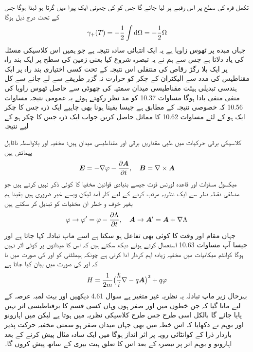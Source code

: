 تکمل قرہ کی سطح پر اس رقبے پر لیا جائے گا جس کو  کی چھوٹی ایک پیرا میں گرتا ہو لہذا  ہوگا جس کے تحت درج ذیل ہوگا 
\begin{align} 
\gamma_{+} (T) = - \frac{1}{2} \int \dif \Omega = - \frac{1}{2} \Omega
\end{align}
جہاں مبده پر ٹھوس زاویا  ہے یہ ایک انتہائی سادہ نتیجہ ہے جو ہمیں اس کلاسیکی مسئلہ کی یاد دلاتا ہے جس سے ہم نے یہ تبصرہ شروع کیا یعنی زمین کی سطح پر ایک بند راہ پر ایک بلا رگڑ   رقاص   کی منتقلی اس نتیجہ کے تحت کسی اختیاری بند راہ پر ایک مقناطیس کی مدد سے الیکٹران کے چکر کو حرارت نہ گزر طریقے سے لے جانے سے کل ہندسی تبدیلی ہیئت مقناطیسی میدان سمتیہ کی چھوٹی سے حاصل ٹھوس زاویا کی منفی منفی بادا ہوگا مساوات 10.37 کو مد نظر رکھتے ہوئے یہ عمومی نتیجہ مساوات 10.56 کہ خصوصی نتیجہ کے مطابق ہے جیسا یقینا ہونا بھی چاہیے 
ایک ذرہ جس کا چکر ایک ہو کے لئے مساوات 10.62 کا مماثل حاصل کریں جواب  ایک ذرہ جس کا چکر  ہو کے لیے نتیجہ  


کلاسیکی برقی حرکیات میں طبی مقداریں برقی اور مقناطیسی میدان ہیں؛ مخفیہ  اور  بلاواسطہ ناقابل پیمائش ہیں 
\begin{align}
{\ensuremath{{\boldsymbol{E}}}} = - \nabla \varphi - \frac{\partial {\ensuremath{{\boldsymbol{A}}}}}{\partial t}, \quad {\ensuremath{{\boldsymbol{B}}}} = \nabla \times {\ensuremath{{\boldsymbol{A}}}}
\end{align}
میکسول مساوات اور قاعدہ لورنس قوت جیسے بنیادی قوانین مخفیا کا کوئی ذکر نہیں کرتے ہیں جو منطقی نقطہ نظر سے ایک نظریہ  مرتب کرنے  کے لیے کار آمد لیکن ویسے غیر ضروری ہیں یقینا ہم بغیر خوف و خطر ان مخفیات کو تبدیل کر سکتے ہیں 
\begin{align}
\varphi \to \varphi' = \varphi - \frac{\partial \Lambda}{\partial t}, \quad {\ensuremath{{\boldsymbol{A}}}} \to {\ensuremath{{\boldsymbol{A}}}}' = {{\boldsymbol{A}}} + \nabla \Lambda
\end{align}
جہاں  مقام اور وقت کا کوئی بھی تفاعل ہو سکتا ہے اسے ماپ تبادلہ کہا جاتا ہے اور جیسا آپ مساوات 10.63 استعمال کرتے ہوئے دیکھ سکتے ہیں کہ اس کا میدانوں پر کوئی اثر نہیں ہوگا کوانٹم میکانیات میں مخفیہ زیادہ اہم کردار ادا کرتی ہے چونکہ ہیملٹنی کو  اور  کی صورت میں نا کہ  اور  کی صورت میں بیان کیا جاتا ہے 
\begin{align}
H = \frac{1}{2m} \big ( \frac{\hslash}{i} \nabla - q {{\boldsymbol{A}}} \big )^2 + q \varphi
\end{align}
بہرحال  زیر ماپ تبادلہ یہ نظریہ  غیر متغیر ہے سوال 4.61 دیکھیں اور بہت لمبہ  عرصہ کے لیے مانا گیا کہ  جن خطوں میں   اور  صفر ہوں وہاں کسی قسم کا برقناطیسی اثر نہیں پایا جائے گا بالکل اسی طرح جس طرح کلاسیکی نظریہ میں ہوتا ہے لیکن  میں اہارونو اور بوہم نے دکھایا کہ اس خطہ میں بھی جہاں میدان صفر ہو سمتی مخفیہ حرکت پذیر باردار ذرا کے کوانٹائی رویہ پر اثر انداز ہوگا میں ایک سادہ مثال پیش کرنے کے بعد اہارونو و بوہم   اثر پر تبصرہ کے بعد اس کا تعلق ہیت بیری کے ساتھ پیش کروں گا۔


